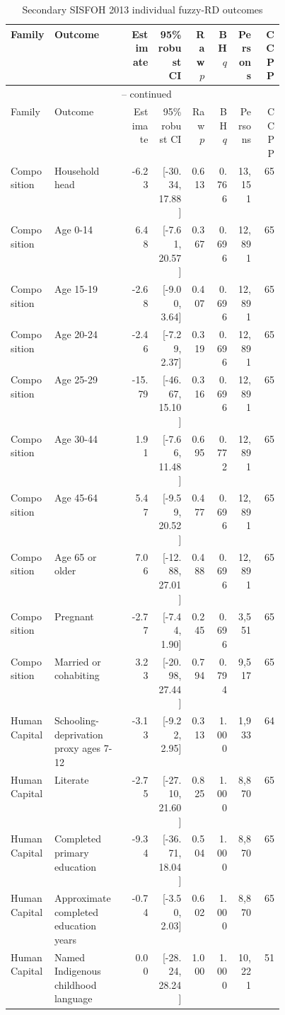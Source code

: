 \begingroup
\scriptsize
\begin{longtable}{p{0.16\linewidth}p{0.29\linewidth}rrrrrr}
\caption{Secondary SISFOH 2013 individual fuzzy-RD outcomes}
\label{tab:rd_outcomes_secondary_2013_individual} \\
\toprule
Family & Outcome & Estimate & 95\% robust CI & Raw \(p\) & BH \(q\) & Persons & CCPP \\
\midrule
\endfirsthead
\multicolumn{8}{c}{\tablename\ \thetable{} -- continued} \\
\toprule
Family & Outcome & Estimate & 95\% robust CI & Raw \(p\) & BH \(q\) & Persons & CCPP \\
\midrule
\endhead
Composition & Household head & -6.23 & [-30.34, 17.88] & 0.613 & 0.766 & 13,151 & 65 \\
Composition & Age 0-14 & 6.48 & [-7.61, 20.57] & 0.367 & 0.696 & 12,891 & 65 \\
Composition & Age 15-19 & -2.68 & [-9.00, 3.64] & 0.407 & 0.696 & 12,891 & 65 \\
Composition & Age 20-24 & -2.46 & [-7.29, 2.37] & 0.319 & 0.696 & 12,891 & 65 \\
Composition & Age 25-29 & -15.79 & [-46.67, 15.10] & 0.316 & 0.696 & 12,891 & 65 \\
Composition & Age 30-44 & 1.91 & [-7.66, 11.48] & 0.695 & 0.772 & 12,891 & 65 \\
Composition & Age 45-64 & 5.47 & [-9.59, 20.52] & 0.477 & 0.696 & 12,891 & 65 \\
Composition & Age 65 or older & 7.06 & [-12.88, 27.01] & 0.488 & 0.696 & 12,891 & 65 \\
Composition & Pregnant & -2.77 & [-7.44, 1.90] & 0.245 & 0.696 & 3,551 & 65 \\
Composition & Married or cohabiting & 3.23 & [-20.98, 27.44] & 0.794 & 0.794 & 9,517 & 65 \\
Human Capital & Schooling-deprivation proxy ages 7-12 & -3.13 & [-9.22, 2.95] & 0.313 & 1.000 & 1,933 & 64 \\
Human Capital & Literate & -2.75 & [-27.10, 21.60] & 0.825 & 1.000 & 8,870 & 65 \\
Human Capital & Completed primary education & -9.34 & [-36.71, 18.04] & 0.504 & 1.000 & 8,870 & 65 \\
Human Capital & Approximate completed education years & -0.74 & [-3.50, 2.03] & 0.602 & 1.000 & 8,870 & 65 \\
Human Capital & Named Indigenous childhood language & 0.00 & [-28.24, 28.24] & 1.000 & 1.000 & 10,221 & 51 \\

\end{longtable}
